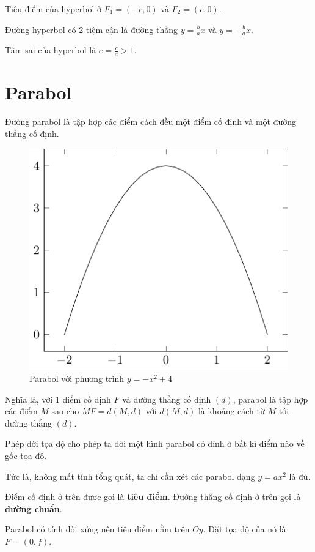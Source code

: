 Tiêu điểm của hyperbol ở $F_1 = (-c, 0)$ và $F_2 = (c, 0)$.

Đường hyperbol có 2 tiệm cận là đường thẳng $y = \frac{b}{a} x$ và $y = -\frac{b}{a} x$.

Tâm sai của hyperbol là $e = \frac{c}{a} > 1$.

\section{Parabol}

\begin{definition}[Parabol]
    Đường parabol là tập hợp các điểm cách đều một điểm cố định và một đường thẳng cố định.
\end{definition}

\begin{figure}[ht]
    \centering
    \includegraphics{pics/conics/parabola.pdf}
    \caption{Parabol với phương trình $y = -x^2 + 4$}
\end{figure}

Nghĩa là, với 1 điểm cố định $F$ và đường thẳng cố định $(d)$, parabol là tập hợp các điểm $M$ sao cho $MF = d(M, d)$ với $d(M, d)$ là khoảng cách từ $M$ tới đường thẳng $(d)$.

Phép dời tọa độ cho phép ta dời một hình parabol có đỉnh ở bất kì điểm nào về gốc tọa độ.

Tức là, không mất tính tổng quát, ta chỉ cần xét các parabol dạng $y=ax^2$ là đủ.

Điểm cố định ở trên được gọi là \textbf{tiêu điểm}. Đường thẳng cố định ở trên gọi là \textbf{đường chuẩn}.

Parabol có tính đối xứng nên tiêu điểm nằm trên $Oy$. Đặt tọa độ của nó là $F = (0, f)$.

